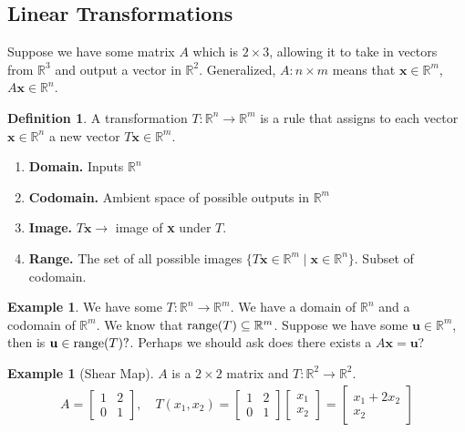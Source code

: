 \documentclass{article}
\numberwithin{equation}{section}
\theoremstyle{definition}
\newtheorem{defn}{Definition}[subsection]
\newtheorem{ex}[thm]{Example}
\newcommand{\U}{\mathbf{u}}
\newcommand{\R}{\mathbb{R}}
\theoremstyle{adefn}
\begin{document}
	\subsection{Linear Transformations}
	Suppose we have some matrix $A$ which is $2 \times 3$, allowing it to take in vectors from $\R^3$ and output a vector in $\R^2$. Generalized, $A: n \times m$ means that $\mathbf{x} \in \R^m$, $A\mathbf{x} \in \R^n$.
	\begin{defn}
		A transformation $T: \R^n \to \R^m$ is a rule that assigns to each vector $\mathbf{x} \in \R^n$ a new vector $T\mathbf{x} \in \R^m$.
	\end{defn}
	\begin{enumerate}
		\itemsep0em 
		\item \textbf{Domain.} Inputs $\R^n$
		\item \textbf{Codomain.} Ambient space of possible outputs in $\R^m$
		\item \textbf{Image.} $T\mathbf{x} \rightarrow$ image of \textbf{x} under $T$.
		\item \textbf{Range.} The set of all possible images $\{ T\mathbf{x} \in \R^m \mid \mathbf{x} \in \R^n \}$. Subset of codomain. 
	\end{enumerate}
	\begin{ex}
		We have some $T: \R^n \to \R^m$. We have a domain of $\R^n$ and a codomain of $\R^m$. We know that $\hbox{range}(T) \subseteq \R^m$. Suppose we have some $\U \in \R^m$, then is $\U \in \hbox{range}(T)?$. Perhaps we should ask does there exists a $A\mathbf{x} = \U$? 
	\end{ex}
	\begin{ex}[Shear Map]
		$A$ is a $2 \times 2$ matrix and $T: \R^2 \to \R^2$. 
		\begin{align*}
			A = \begin{bmatrix}
				1 & 2 \\ 0 & 1
			\end{bmatrix},\quad T(x_1, x_2) = \begin{bmatrix}
			1 & 2 \\ 0 & 1
			\end{bmatrix}\begin{bmatrix}
			x_1 \\ x_2
			\end{bmatrix} = \begin{bmatrix}
			x_1 + 2x_2 \\ x_2
			\end{bmatrix}
		\end{align*}
	\end{ex}
	
\end{document}
